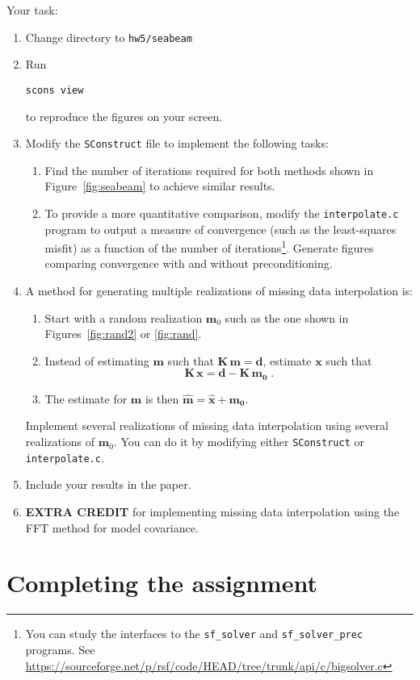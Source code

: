Your task:
\begin{enumerate}
\item Change directory to \texttt{hw5/seabeam}
\item Run 
\begin{verbatim}
scons view
\end{verbatim}
to reproduce the figures on your screen.
\item Modify the \texttt{SConstruct} file to implement the following tasks:
\begin{enumerate}
\item Find the number of iterations required for both methods shown in Figure~\ref{fig:seabeam} to achieve similar results.
\item To provide a more quantitative comparison, modify the
\texttt{interpolate.c} program to output a measure of convergence
(such as the least-squares misfit) as a function of the number
of iterations\footnote{You can study the interfaces to
the \texttt{sf\_solver} and
\texttt{sf\_solver\_prec} programs. See
\url{https://sourceforge.net/p/rsf/code/HEAD/tree/trunk/api/c/bigsolver.c}}. Generate figures comparing convergence with and without preconditioning.
\end{enumerate}
\item A method for generating multiple realizations of missing data interpolation is:
\begin{enumerate}
\item Start with a random realization $\mathbf{m}_0$ such as the one shown in Figures~\ref{fig:rand2} or \ref{fig:rand}.
\item Instead of estimating $\mathbf{m}$ such that $\mathbf{K}\,\mathbf{m} = \mathbf{d}$, 
      estimate $\mathbf{x}$ such that 
\[
\mathbf{K}\,\mathbf{x} = \mathbf{d}- \mathbf{K}\,\mathbf{m_0}\;.
\]
\item The estimate for $\mathbf{m}$ is then  $\widehat{\mathbf{m}} = \widehat{\mathbf{x}}+\mathbf{m_0}$.
\end{enumerate}
Implement several realizations of missing data interpolation using
several realizations of $\mathbf{m}_0$. You can do it by modifying
either \texttt{SConstruct} or \texttt{interpolate.c}.
\item Include your results in the paper.
\item \textbf{EXTRA CREDIT} for implementing missing data interpolation using the FFT method for model covariance.
\end{enumerate}

\section{Completing the assignment}

